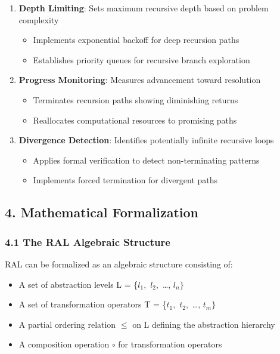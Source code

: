 \documentclass[
]{article}
\providecommand{\tightlist}{%
  \setlength{\itemsep}{0pt}\setlength{\parskip}{0pt}}
\begin{document}
\begin{enumerate}
\def\labelenumi{\arabic{enumi}.}
\tightlist
\item
  \textbf{Depth Limiting}: Sets maximum recursive depth based on problem
  complexity

  \begin{itemize}
  \tightlist
  \item
    Implements exponential backoff for deep recursion paths
  \item
    Establishes priority queues for recursive branch exploration
  \end{itemize}
\item
  \textbf{Progress Monitoring}: Measures advancement toward resolution

  \begin{itemize}
  \tightlist
  \item
    Terminates recursion paths showing diminishing returns
  \item
    Reallocates computational resources to promising paths
  \end{itemize}
\item
  \textbf{Divergence Detection}: Identifies potentially infinite
  recursive loops

  \begin{itemize}
  \tightlist
  \item
    Applies formal verification to detect non-terminating patterns
  \item
    Implements forced termination for divergent paths
  \end{itemize}
\end{enumerate}

\subsection{4. Mathematical
Formalization}\label{mathematical-formalization-1}

\subsubsection{4.1 The RAL Algebraic
Structure}\label{the-ral-algebraic-structure}

RAL can be formalized as an algebraic structure consisting of:

\begin{itemize}
\tightlist
\item
  A set of abstraction levels L = \{\(l_{1},\) \(l_{2},\) \ldots,
  \(l_{n}\}\)
\item
  A set of transformation operators T = \{\(t_{1},\) \(t_{2},\) \ldots,
  \(t_{m}\}\)
\item
  A partial ordering relation \(\leq \) on L defining the abstraction
  hierarchy
\item
  A composition operation \(\circ \) for transformation operators
\end{itemize}
\end{document}

